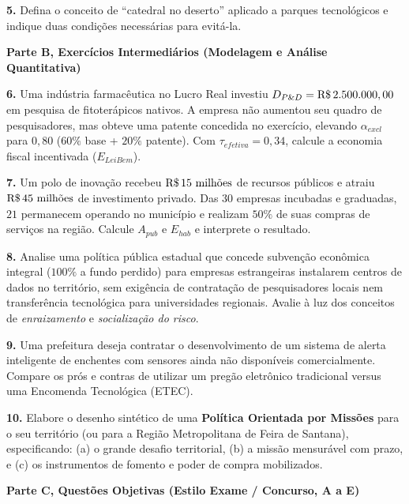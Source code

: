 \textbf{5.} Defina o conceito de ``catedral no deserto'' aplicado a parques tecnológicos e indique duas condições necessárias para evitá-la.
\espacoResolucao[1.8cm]

\textbf{Parte B, Exercícios Intermediários (Modelagem e Análise Quantitativa)}

\textbf{6.} Uma indústria farmacêutica no Lucro Real investiu $D_{P\&D} = \text{R\$\,}{2.500.000,00}$ em pesquisa de fitoterápicos nativos. A empresa não aumentou seu quadro de pesquisadores, mas obteve uma patente concedida no exercício, elevando $\alpha_{excl}$ para $0{,}80$ ($60\%$ base + $20\%$ patente). Com $\tau_{efetiva} = 0{,}34$, calcule a economia fiscal incentivada ($E_{LeiBem}$).
\espacoResolucao[2.0cm]

\textbf{7.} Um polo de inovação recebeu $\text{R\$\,}{15\text{ milhões}}$ de recursos públicos e atraiu $\text{R\$\,}{45\text{ milhões}}$ de investimento privado. Das $30$ empresas incubadas e graduadas, $21$ permanecem operando no município e realizam $50\%$ de suas compras de serviços na região. Calcule $A_{pub}$ e $E_{hab}$ e interprete o resultado.
\espacoResolucao[2.0cm]

\textbf{8.} Analise uma política pública estadual que concede subvenção econômica integral ($100\%$ a fundo perdido) para empresas estrangeiras instalarem centros de dados no território, sem exigência de contratação de pesquisadores locais nem transferência tecnológica para universidades regionais. Avalie à luz dos conceitos de \textit{enraizamento} e \textit{socialização do risco}.
\espacoResolucao[2.0cm]

\textbf{9.} Uma prefeitura deseja contratar o desenvolvimento de um sistema de alerta inteligente de enchentes com sensores ainda não disponíveis comercialmente. Compare os prós e contras de utilizar um pregão eletrônico tradicional versus uma Encomenda Tecnológica (ETEC).
\espacoResolucao[2.0cm]

\textbf{10.} Elabore o desenho sintético de uma \textbf{Política Orientada por Missões} para o seu território (ou para a Região Metropolitana de Feira de Santana), especificando: (a) o grande desafio territorial, (b) a missão mensurável com prazo, e (c) os instrumentos de fomento e poder de compra mobilizados.
\espacoResolucao[2.0cm]

\textbf{Parte C, Questões Objetivas (Estilo Exame / Concurso, A a E)}

